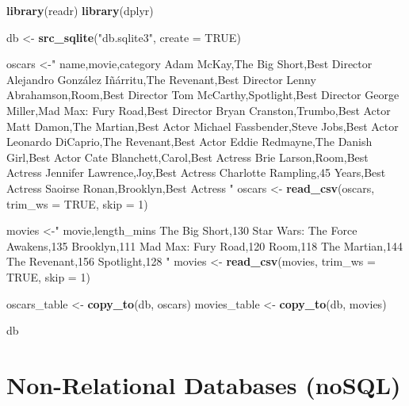 \documentclass[]{book}
\newenvironment{Shaded}{\begin{snugshade}}{\end{snugshade}}
\newcommand{\KeywordTok}[1]{\textcolor[rgb]{0.13,0.29,0.53}{\textbf{#1}}}
\newcommand{\DataTypeTok}[1]{\textcolor[rgb]{0.13,0.29,0.53}{#1}}
\newcommand{\DecValTok}[1]{\textcolor[rgb]{0.00,0.00,0.81}{#1}}
\newcommand{\StringTok}[1]{\textcolor[rgb]{0.31,0.60,0.02}{#1}}
\newcommand{\OtherTok}[1]{\textcolor[rgb]{0.56,0.35,0.01}{#1}}
\newcommand{\NormalTok}[1]{#1}
\theoremstyle{definition}
\theoremstyle{definition}
\theoremstyle{definition}
\theoremstyle{remark}
\begin{document}
\begin{Shaded}
\begin{Highlighting}[]
\KeywordTok{library}\NormalTok{(readr)}
\KeywordTok{library}\NormalTok{(dplyr)}

\NormalTok{db <-}\StringTok{ }\KeywordTok{src_sqlite}\NormalTok{(}\StringTok{"db.sqlite3"}\NormalTok{, }\DataTypeTok{create =} \OtherTok{TRUE}\NormalTok{)}

\NormalTok{oscars <-}\StringTok{"}
\StringTok{name,movie,category}
\StringTok{Adam McKay,The Big Short,Best Director}
\StringTok{Alejandro González Iñárritu,The Revenant,Best Director}
\StringTok{Lenny Abrahamson,Room,Best Director}
\StringTok{Tom McCarthy,Spotlight,Best Director}
\StringTok{George Miller,Mad Max: Fury Road,Best Director}
\StringTok{Bryan Cranston,Trumbo,Best Actor}
\StringTok{Matt Damon,The Martian,Best Actor}
\StringTok{Michael Fassbender,Steve Jobs,Best Actor}
\StringTok{Leonardo DiCaprio,The Revenant,Best Actor}
\StringTok{Eddie Redmayne,The Danish Girl,Best Actor}
\StringTok{Cate Blanchett,Carol,Best Actress}
\StringTok{Brie Larson,Room,Best Actress}
\StringTok{Jennifer Lawrence,Joy,Best Actress}
\StringTok{Charlotte Rampling,45 Years,Best Actress}
\StringTok{Saoirse Ronan,Brooklyn,Best Actress}
\StringTok{"}
\NormalTok{oscars <-}\StringTok{ }\KeywordTok{read_csv}\NormalTok{(oscars, }\DataTypeTok{trim_ws =} \OtherTok{TRUE}\NormalTok{, }\DataTypeTok{skip =} \DecValTok{1}\NormalTok{)}

\NormalTok{movies <-}\StringTok{"}
\StringTok{movie,length_mins}
\StringTok{The Big Short,130}
\StringTok{Star Wars: The Force Awakens,135}
\StringTok{Brooklyn,111}
\StringTok{Mad Max: Fury Road,120}
\StringTok{Room,118}
\StringTok{The Martian,144}
\StringTok{The Revenant,156}
\StringTok{Spotlight,128}
\StringTok{"}
\NormalTok{movies <-}\StringTok{ }\KeywordTok{read_csv}\NormalTok{(movies, }\DataTypeTok{trim_ws =} \OtherTok{TRUE}\NormalTok{, }\DataTypeTok{skip =} \DecValTok{1}\NormalTok{)}

\NormalTok{oscars_table <-}\StringTok{ }\KeywordTok{copy_to}\NormalTok{(db, oscars)}
\NormalTok{movies_table <-}\StringTok{ }\KeywordTok{copy_to}\NormalTok{(db, movies)}

\NormalTok{db}
\end{Highlighting}
\end{Shaded}

\section{Non-Relational Databases
(noSQL)}\label{non-relational-databases-nosql}
\end{document}
